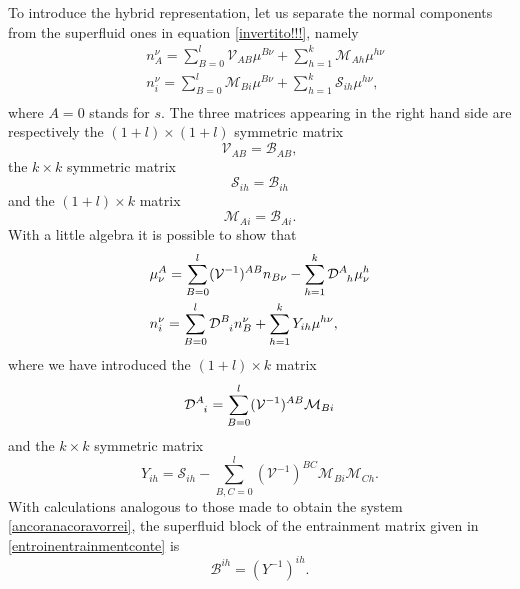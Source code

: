 \documentclass[usenatbib]{mnras}
\begin{document}
To introduce the hybrid representation, let us separate  the normal components from the superfluid ones in equation \eqref{invertito!!!}, namely
%
\begin{equation}
\begin{split}
& n_A^\nu = \sum_{B=0}^l \mathcal{V}_{AB} \mu^{B\nu} + \sum_{h=1}^k \mathcal{M}_{Ah} \mu^{h\nu} \\
& n_i^\nu = \sum_{B=0}^l \mathcal{M}_{Bi} \mu^{B\nu} + \sum_{h=1}^k \mathcal{S}_{ih} \mu^{h\nu},\\
\end{split}
\end{equation}
%
where $A=0$ stands for $s$. The three matrices appearing in the right hand side are respectively the $(1+l)\times (1+l)$ symmetric matrix
%
\begin{equation}
\mathcal{V}_{AB} = \mathcal{B}_{AB},
\end{equation}
%
the $k \times k$ symmetric matrix
%
\begin{equation}
\mathcal{S}_{ih} = \mathcal{B}_{ih}
\end{equation}
%
and the $(1+l)\times k$ matrix
%
\begin{equation}
\mathcal{M}_{Ai} = \mathcal{B}_{Ai}.
\end{equation}
%
With a little algebra it is possible to show that
%
\begin{equation}
\label{ancoranacoravorrei}
\begin{split}
& \mu^A_\nu = \sum_{B=0}^l (\mathcal{V}^{-1})^{AB} n_{B\nu} - \sum_{h=1}^k \mathcal{D}\indices{^A _h} \mu^{h}_\nu \\
& n_i^\nu = \sum_{B=0}^l \mathcal{D}\indices{^B _i} n_B^\nu + \sum_{h=1}^k Y_{ih} \mu^{h\nu},\\
\end{split}
\end{equation}
%
where we have introduced the $(1+l)\times k$ matrix
%
\begin{equation}
 \mathcal{D}\indices{^A _i} = \sum_{B=0}^l (\mathcal{V}^{-1})^{AB} \mathcal{M}_{Bi} 
\end{equation}
%
and the $k \times k$ symmetric matrix
%
\begin{equation}
Y_{ih} = \mathcal{S}_{ih} - \sum_{B,C =0}^l (\mathcal{V}^{-1})^{BC} \mathcal{M}_{Bi} \mathcal{M}_{Ch}.
\end{equation}
%
With calculations analogous to those made to obtain the system \eqref{ancoranacoravorrei}, the superfluid block of the entrainment matrix given in \eqref{entroinentrainmentconte} is 
%
\begin{equation}\label{uscendoentrainmentconte}
\mathcal{B}^{ih} = (Y^{-1})^{ih}.
\end{equation} 
\end{document}
